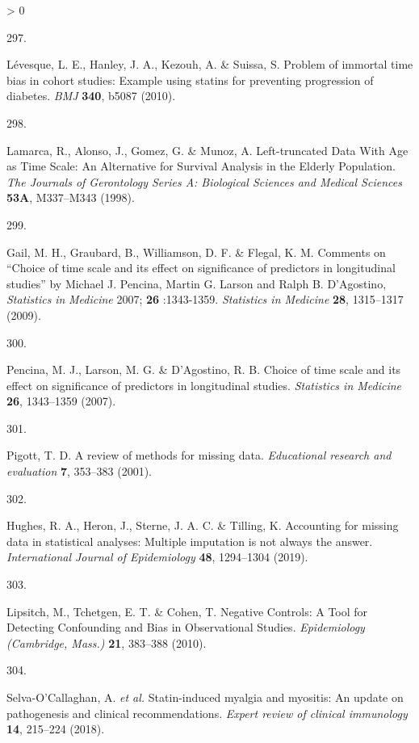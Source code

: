\documentclass[a4paper, twoside]{templates/ociamthesis}
\newlength{\cslhangindent}
\newlength{\csllabelwidth}
\newenvironment{CSLReferences}[3] %
 {%
  \setlength{\parindent}{0pt}
  \ifodd #1 \everypar{\setlength{\hangindent}{\cslhangindent}}\ignorespaces\fi
  \ifnum #2 > 0
  \setlength{\parskip}{#2\baselineskip}
  \fi
 }%
 {}
\newcommand{\CSLLeftMargin}[1]{\parbox[t]{\maxof{\widthof{#1}}{\csllabelwidth}}{#1}}
\newcommand{\CSLRightInline}[1]{\parbox[t]{\linewidth - \csllabelwidth}{#1}}
\begin{document}
\begin{CSLReferences}{0}{0}
\leavevmode\hypertarget{ref-levesque2010}{}%
\CSLLeftMargin{297. }
\CSLRightInline{Lévesque, L. E., Hanley, J. A., Kezouh, A. \& Suissa, S. Problem of immortal time bias in cohort studies: Example using statins for preventing progression of diabetes. \emph{BMJ} \textbf{340}, b5087 (2010).}

\leavevmode\hypertarget{ref-lamarca1998}{}%
\CSLLeftMargin{298. }
\CSLRightInline{Lamarca, R., Alonso, J., Gomez, G. \& Munoz, A. Left-truncated {Data With Age} as {Time Scale}: An {Alternative} for {Survival Analysis} in the {Elderly Population}. \emph{The Journals of Gerontology Series A: Biological Sciences and Medical Sciences} \textbf{53A}, M337--M343 (1998).}

\leavevmode\hypertarget{ref-gail2009}{}%
\CSLLeftMargin{299. }
\CSLRightInline{Gail, M. H., Graubard, B., Williamson, D. F. \& Flegal, K. M. Comments on {``{Choice} of time scale and its effect on significance of predictors in longitudinal studies''} by {Michael J}. {Pencina}, {Martin G}. {Larson} and {Ralph B}. {D}'{Agostino}, {\emph{Statistics}}{ \emph{in} }{\emph{Medicine}} 2007; {\textbf{26}} :1343-1359. \emph{Statistics in Medicine} \textbf{28}, 1315--1317 (2009).}

\leavevmode\hypertarget{ref-pencina2007}{}%
\CSLLeftMargin{300. }
\CSLRightInline{Pencina, M. J., Larson, M. G. \& D'Agostino, R. B. Choice of time scale and its effect on significance of predictors in longitudinal studies. \emph{Statistics in Medicine} \textbf{26}, 1343--1359 (2007).}

\leavevmode\hypertarget{ref-pigott2001}{}%
\CSLLeftMargin{301. }
\CSLRightInline{Pigott, T. D. A review of methods for missing data. \emph{Educational research and evaluation} \textbf{7}, 353--383 (2001).}

\leavevmode\hypertarget{ref-hughes2019}{}%
\CSLLeftMargin{302. }
\CSLRightInline{Hughes, R. A., Heron, J., Sterne, J. A. C. \& Tilling, K. Accounting for missing data in statistical analyses: Multiple imputation is not always the answer. \emph{International Journal of Epidemiology} \textbf{48}, 1294--1304 (2019).}

\leavevmode\hypertarget{ref-lipsitch2010}{}%
\CSLLeftMargin{303. }
\CSLRightInline{Lipsitch, M., Tchetgen, E. T. \& Cohen, T. Negative {Controls}: A {Tool} for {Detecting Confounding} and {Bias} in {Observational Studies}. \emph{Epidemiology (Cambridge, Mass.)} \textbf{21}, 383--388 (2010).}

\leavevmode\hypertarget{ref-selva-ocallaghan2018}{}%
\CSLLeftMargin{304. }
\CSLRightInline{Selva-O'Callaghan, A. \emph{et al.} Statin-induced myalgia and myositis: An update on pathogenesis and clinical recommendations. \emph{Expert review of clinical immunology} \textbf{14}, 215--224 (2018).}


\end{CSLReferences}
\end{document}
